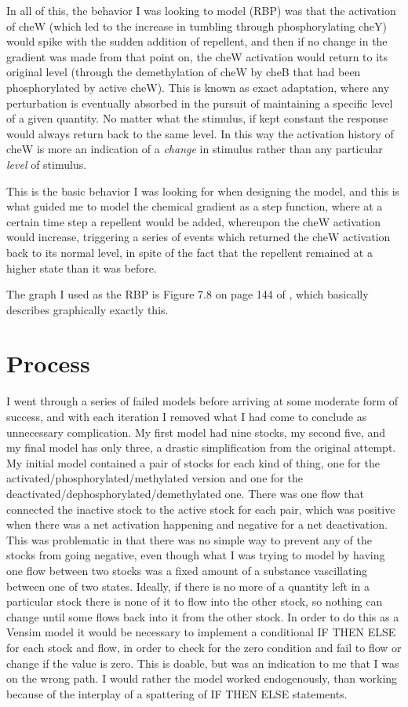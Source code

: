 \documentclass[12pt]{article}
\begin{document}
In all of this, the behavior I was looking to model (RBP) was that the activation of cheW (which led to the increase in tumbling through phosphorylating cheY) would spike with the sudden addition of repellent, and then if no change in the gradient was made from that point on, the cheW activation would return to its original level (through the demethylation of cheW by cheB that had been phosphorylated by active cheW).  This is known as exact adaptation, where any perturbation is eventually absorbed in the pursuit of maintaining a specific level of a given quantity.  No matter what the stimulus, if kept constant the response would always return back to the same level.  In this way the activation history of cheW is more an indication of a {\em change} in stimulus rather than any particular {\em level} of stimulus.  

This is the basic behavior I was looking for when designing the model, and this is what guided me to model the chemical gradient as a step function, where at a certain time step a repellent would be added, whereupon the cheW activation would increase, triggering a series of events which returned the cheW activation back to its normal level, in spite of the fact that the repellent remained at a higher state than it was before.

The graph I used as the RBP is Figure 7.8 on page 144 of \cite{Alon}, which basically describes graphically exactly this.

\section{Process}

I went through a series of failed models before arriving at some moderate form of success, and with each iteration I removed what I had come to conclude as unnecessary complication.  My first model had nine stocks, my second five, and my final model has only three, a drastic simplification from the original attempt.  My initial model contained a pair of stocks for each kind of thing, one for the activated/phosphorylated/methylated version and one for the deactivated/dephosphorylated/demethylated one.  There was one flow that connected the inactive stock to the active stock for each pair, which was positive when there was a net activation happening and negative for a net deactivation.  This was problematic in that there was no simple way to prevent any of the stocks from going negative, even though what I was trying to model by having one flow between two stocks was a fixed amount of a substance vascillating between one of two states.  Ideally, if there is no more of a quantity left in a particular stock there is none of it to flow into the other stock, so nothing can change until some flows back into it from the other stock.  In order to do this as a Vensim model it would be necessary to implement a conditional IF THEN ELSE for each stock and flow, in order to check for the zero condition and fail to flow or change if the value is zero.  This is doable, but was an indication to me that I was on the wrong path.  I would rather the model worked endogenously, than working because of the interplay of a spattering of IF THEN ELSE statements.  
\end{document}
